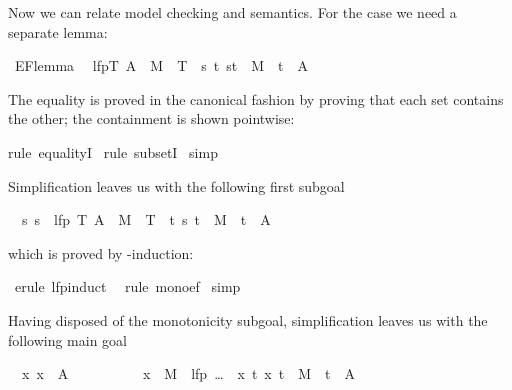 \begin{isabellebody}
\begin{isamarkuptext}
Now we can relate model checking and semantics. For the  case we need
a separate lemma:%
\end{isamarkuptext}%
\ EF{\isacharunderscore}lemma{\isacharcolon}\isanewline
\ \ {\isachardoublequote}lfp{\isacharparenleft}{\isasymlambda}T{\isachardot}\ A\ {\isasymunion}\ M{\isasyminverse}\ {\isacharbackquote}{\isacharbackquote}{\isacharbackquote}\ T{\isacharparenright}\ {\isacharequal}\ {\isacharbraceleft}s{\isachardot}\ {\isasymexists}t{\isachardot}\ {\isacharparenleft}s{\isacharcomma}t{\isacharparenright}\ {\isasymin}\ M\isactrlsup {\isacharasterisk}\ {\isasymand}\ t\ {\isasymin}\ A{\isacharbraceright}{\isachardoublequote}%
\begin{isamarkuptxt}%
\noindent
The equality is proved in the canonical fashion by proving that each set
contains the other; the containment is shown pointwise:%
\end{isamarkuptxt}%
rule\ equalityI{\isacharparenright}\isanewline
\ rule\ subsetI{\isacharparenright}\isanewline
\ simp{\isacharparenright}%
\begin{isamarkuptxt}%
\noindent
Simplification leaves us with the following first subgoal
\begin{isabelle}%
\ {}{\isachardot}\ {\isasymAnd}s{\isachardot}\ s\ {\isasymin}\ lfp\ {\isacharparenleft}{\isasymlambda}T{\isachardot}\ A\ {\isasymunion}\ M{\isasyminverse}\ {\isacharbackquote}{\isacharbackquote}{\isacharbackquote}\ T{\isacharparenright}\ {\isasymLongrightarrow}\ {\isasymexists}t{\isachardot}\ {\isacharparenleft}s{\isacharcomma}\ t{\isacharparenright}\ {\isasymin}\ M\isactrlsup {\isacharasterisk}\ {\isasymand}\ t\ {\isasymin}\ A%
\end{isabelle}
which is proved by -induction:%
\end{isamarkuptxt}%
\ erule\ lfp{\isacharunderscore}induct{\isacharparenright}\isanewline
\ \ rule\ mono{\isacharunderscore}ef{\isacharparenright}\isanewline
\ simp{\isacharparenright}%
\begin{isamarkuptxt}%
\noindent
Having disposed of the monotonicity subgoal,
simplification leaves us with the following main goal
\begin{isabelle}
\ {}{\isachardot}\ {\isasymAnd}x{\isachardot}\ x\ {\isasymin}\ A\ {\isasymor}\isanewline
\ \ \ \ \ \ \ \ \ x\ {\isasymin}\ M{\isasyminverse}\ {\isacharbackquote}{\isacharbackquote}{\isacharbackquote}\ {\isacharparenleft}lfp\ {\isacharparenleft}\dots{\isacharparenright}\ {\isasyminter}\ {\isacharbraceleft}x{\isachardot}\ {\isasymexists}t{\isachardot}\ {\isacharparenleft}x{\isacharcomma}\ t{\isacharparenright}\ {\isasymin}\ M\isactrlsup {\isacharasterisk}\ {\isasymand}\ t\ {\isasymin}\ A{\isacharbraceright}{\isacharparenright}\isanewline

\end{isabelle}
\end{isamarkuptxt}
\end{isabellebody}
